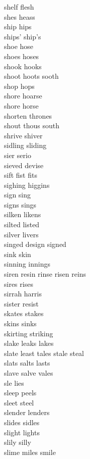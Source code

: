 shelf flesh\\
shes heass \\
ship hips\\
ships' ship's\\
shoe hose\\
shoes hoses\\
shook hooks\\
shoot hoots sooth\\
shop hops\\
shore hoarse \\
shore horse\\
shorten thrones\\
shout thous south\\
shrive shiver\\
sidling sliding\\
sier serio \\
sieved devise\\
sift fist fits\\
sighing higgins\\
sign sing\\
signs sings\\
silken likens\\
silted listed\\
silver livers\\
singed design signed\\
sink skin\\
sinning innings\\
siren resin rinse risen reins\\
sires rises\\
sirrah harris\\
sister resist\\
skates stakes\\
skins sinks\\
skirting striking\\
slake leaks lakes\\
slate least tales stale steal\\
slats salts lasts\\
slave salve vales\\
sle lies \\
sleep peels\\
sleet steel\\
slender lenders\\
slides sidles\\
slight lights\\
slily silly\\
slime miles smile\\

